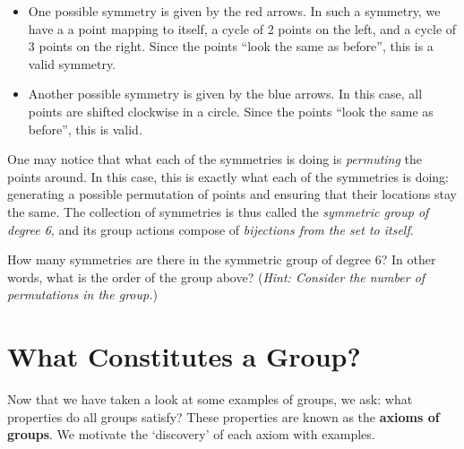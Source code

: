 \begin{itemize}
    \item One possible symmetry is given by the red arrows. In such a symmetry, we have a a point mapping to itself, a cycle of 2 points on the left, and a cycle of 3 points on the right. Since the points ``look the same as before'', this is a valid symmetry.
    \item Another possible symmetry is given by the blue arrows. In this case, all points are shifted clockwise in a circle. Since the points ``look the same as before'', this is valid.
\end{itemize}

One may notice that what each of the symmetries is doing is \textit{permuting} the points around. In this case, this is exactly what each of the symmetries is doing: generating a possible permutation of points and ensuring that their locations stay the same. The collection of symmetries is thus called the \textit{symmetric group of degree 6}, and its group actions compose of \textit{bijections from the set to itself}.

\begin{exercise}
    How many symmetries are there in the symmetric group of degree 6? In other words, what is the order of the group above?\newline
    (\textit{Hint: Consider the number of permutations in the group.})
\end{exercise}

\section{What Constitutes a Group?}
Now that we have taken a look at some examples of groups, we ask: what properties do all groups satisfy? These properties are known as the \textbf{axioms of groups}. We motivate the `discovery' of each axiom with examples.

\begin{figure}
    \centering
\end{figure}

